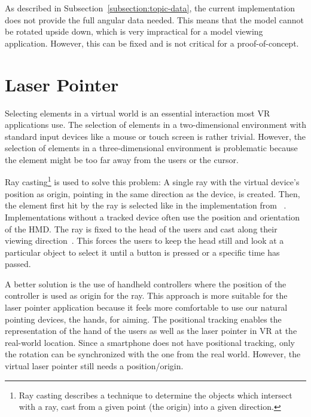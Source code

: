 As described in Subsection~\ref{subsection:topic-data}, the current implementation does not provide the full angular data needed. This means that the model cannot be rotated upside down, which is very impractical for a model viewing application. However, this can be fixed and is not critical for a proof-of-concept.


\section{Laser Pointer}\label{section:laser-pointer}

Selecting elements in a virtual world is an essential interaction most \gls{VR} applications use. The selection of elements in a two-dimensional environment with standard input devices like a mouse or touch screen is rather trivial. However, the selection of elements in a three-dimensional environment is problematic because the element might be too far away from the users or the cursor.

Ray casting\footnote{Ray casting describes a technique to determine the objects which intersect with a ray, cast from a given point (the origin) into a given direction.} is used to solve this problem: A single ray with the virtual device's position as origin, pointing in the same direction as the device, is created. Then, the element first hit by the ray is selected like in the implementation from \citeauthor{Steed.2013}~\cite[46]{Steed.2013}. Implementations without a tracked device often use the position and orientation of the \gls{HMD}. The ray is fixed to the head of the users and cast along their viewing direction~\cite[23]{Kamm.2018}. This forces the users to keep the head still and look at a particular object to select it until a button is pressed or a specific time has passed.

A better solution is the use of handheld controllers where the position of the controller is used as origin for the ray. This approach is more suitable for the laser pointer application because it feels more comfortable to use our natural pointing devices, the hands, for aiming. The positional tracking enables the representation of the hand of the users as well as the laser pointer in \gls{VR} at the real-world location. Since a smartphone does not have positional tracking, only the rotation can be synchronized with the one from the real world. However, the virtual laser pointer still needs a position/origin.

